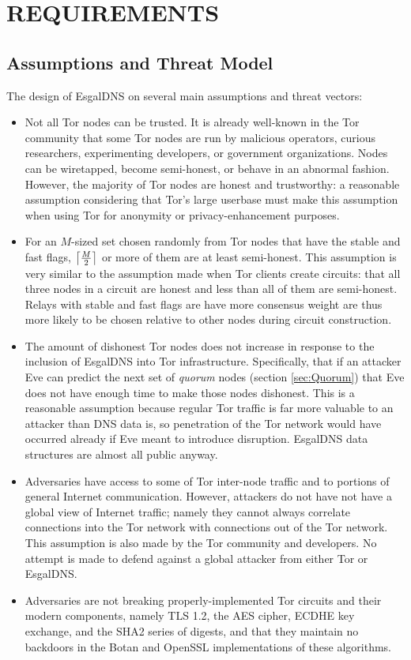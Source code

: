 
\chapter{REQUIREMENTS}

\section{Assumptions and Threat Model}

The design of EsgalDNS on several main assumptions and threat vectors:

\begin{itemize}
  \item Not all Tor nodes can be trusted. It is already well-known in the Tor community that some Tor nodes are run by malicious operators, curious researchers, experimenting developers, or government organizations. Nodes can be wiretapped, become semi-honest, or behave in an abnormal fashion. However, the majority of Tor nodes are honest and trustworthy: a reasonable assumption considering that Tor's large userbase must make this assumption when using Tor for anonymity or privacy-enhancement purposes.
  \item For an $ M $-sized set chosen randomly from Tor nodes that have the stable and fast flags, $ \ceil[\big]{\frac{M}{2}} $ or more of them are at least semi-honest. This assumption is very similar to the assumption made when Tor clients create circuits: that all three nodes in a circuit are honest and less than all of them are semi-honest. Relays with stable and fast flags are have more consensus weight are thus more likely to be chosen relative to other nodes during circuit construction.
  \item The amount of dishonest Tor nodes does not increase in response to the inclusion of EsgalDNS into Tor infrastructure. Specifically, that if an attacker Eve can predict the next set of \emph{quorum} nodes (section \ref{sec:Quorum}) that Eve does not have enough time to make those nodes dishonest. This is a reasonable assumption because regular Tor traffic is far more valuable to an attacker than DNS data is, so penetration of the Tor network would have occurred already if Eve meant to introduce disruption. EsgalDNS data structures are almost all public anyway.
  \item Adversaries have access to some of Tor inter-node traffic and to portions of general Internet communication. However, attackers do not have not have a global view of Internet traffic; namely they cannot always correlate connections into the Tor network with connections out of the Tor network. This assumption is also made by the Tor community and developers. No attempt is made to defend against a global attacker from either Tor or EsgalDNS.
  \item Adversaries are not breaking properly-implemented Tor circuits and their modern components, namely TLS 1.2, the AES cipher, ECDHE key exchange, and the SHA2 series of digests, and that they maintain no backdoors in the Botan and OpenSSL implementations of these algorithms.
\end{itemize}

